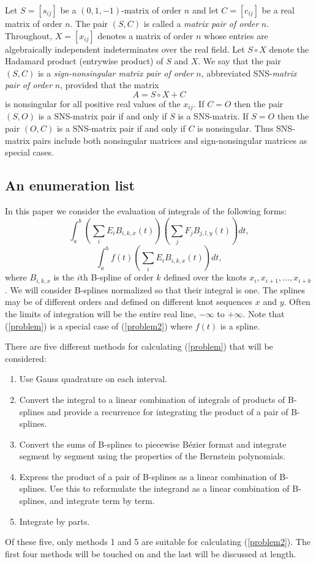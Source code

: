 \documentclass{svk_en}
\begin{document}
Let $S=[s_{ij}]$ be a $(0,1,-1)$-matrix of order $n$ and
let $C=[c_{ij}]$ be a real matrix of order $n$. The pair
$(S,C)$ is called a {\em matrix pair of order} $n$.
Throughout, $X=[x_{ij}]$ denotes a matrix of order $n$
whose entries are algebraically independent indeterminates
over the real field. Let $S\circ X$ denote the Hadamard
product (entrywise product) of $S$ and $X$. We say that the
pair $(S,C)$ is a {\em sign-nonsingular matrix pair of
order} $n$, abbreviated SNS-{\em matrix pair of order} $n$,
provided that the matrix \[A=S\circ X+C\] is nonsingular
for all positive real values of the $x_{ij}$.  If $C=O$
then the pair $(S,O)$ is a SNS-matrix pair if and only if
$S$ is a SNS-matrix.  If $S=O$ then the pair $(O,C)$ is a
SNS-matrix pair if and only if $C$ is nonsingular. Thus
SNS-matrix pairs include both nonsingular matrices and
sign-nonsingular matrices as special cases.
 
\subsection{An enumeration list}
In this paper we consider the evaluation of integrals of the 
following forms:
\begin{equation}
\int_a^b \left( \sum_i E_i B_{i,k,x}(t) \right)
         \left( \sum_j F_j B_{j,l,y}(t) \right) dt,\label{problem}
\end{equation}
\begin{equation}
\int_a^b f(t) \left( \sum_i E_i B_{i,k,x}(t) \right) dt,\label{problem2}
\end{equation}
where $B_{i,k,x}$ is the $i$th B-spline of order $k$ defined over the
knots $x_i, x_{i+1}, \ldots, x_{i+k}$.
We will consider B-splines normalized so that their integral is one.
The splines may be of different orders and
defined on different knot sequences $x$ and $y$.
Often the limits of integration will be the entire real line, $-\infty$
to $+\infty$. Note that (\ref{problem}) is a special case of (\ref{problem2})
where $f(t)$ is a spline.


There are five different methods for calculating (\ref{problem})
that will be considered:
\begin{enumerate}
\item Use Gauss quadrature on each interval.
\item Convert the integral to a linear combination of
      integrals of products of B-splines and provide a recurrence for
      integrating the product of a pair of B-splines.
\item Convert the sums of B-splines to piecewise
      B\'{e}zier format and integrate segment
      by segment using the properties of the Bernstein polynomials.
\item Express the product of a pair of B-splines as a linear combination
      of B-splines.
      Use this to reformulate the integrand as a linear combination
      of B-splines, and integrate term by term.
\item Integrate by parts.
\end{enumerate}
Of these five, only methods 1 and 5 are suitable for calculating 
(\ref{problem2}). The first four methods will be touched on and the 
last will be discussed at length.
\end{document}
